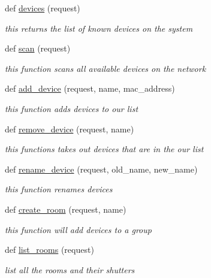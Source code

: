 \begin{DoxyCompactItemize}
def \hyperlink{namespacecontroller_1_1views_a2d4dd7e1f8ecc0560922209253920718}{devices} (request)
\begin{DoxyCompactList}\small\item\em this returns the list of known devices on the system \end{DoxyCompactList}\item 
def \hyperlink{namespacecontroller_1_1views_ad3c247241bafffa26cf97fab00440668}{scan} (request)
\begin{DoxyCompactList}\small\item\em this function scans all available devices on the network \end{DoxyCompactList}\item 
def \hyperlink{namespacecontroller_1_1views_aff74e13b196d5984c8d2d6185c7b2a52}{add\+\_\+device} (request, name, mac\+\_\+address)
\begin{DoxyCompactList}\small\item\em this function adds devices to our list \end{DoxyCompactList}\item 
def \hyperlink{namespacecontroller_1_1views_af29cad87aefb06dec847a90fbb68bc9b}{remove\+\_\+device} (request, name)
\begin{DoxyCompactList}\small\item\em this functions takes out devices that are in the our list \end{DoxyCompactList}\item 
def \hyperlink{namespacecontroller_1_1views_acddd9a99bf531dce5e43cd6512995c32}{rename\+\_\+device} (request, old\+\_\+name, new\+\_\+name)
\begin{DoxyCompactList}\small\item\em this function renames devices \end{DoxyCompactList}\item 
def \hyperlink{namespacecontroller_1_1views_a0a946610cad4aa4fc8684e3f1b16d831}{create\+\_\+room} (request, name)
\begin{DoxyCompactList}\small\item\em this function will add devices to a group \end{DoxyCompactList}\item 
def \hyperlink{namespacecontroller_1_1views_a8d219ce23dd0c7ffc9bd11f6be1122a5}{list\+\_\+rooms} (request)
\begin{DoxyCompactList}\small\item\em list all the rooms and their shutters \end{DoxyCompactList}\item 

\end{DoxyCompactItemize}
